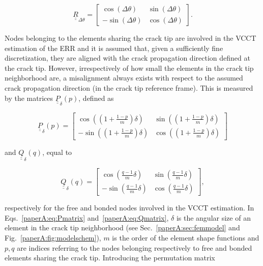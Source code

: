 \begin{equation}\label{paperA:eq:Rmatrix}
\underline{\underline{R}}_{\Delta\theta}=\begin{bmatrix}
\cos\left(\Delta\theta\right) & \sin\left(\Delta\theta\right) \\
-\sin\left(\Delta\theta\right) & \cos\left(\Delta\theta\right)
\end{bmatrix}.
\end{equation}

Nodes belonging to the elements sharing the crack tip are involved in the VCCT estimation of the ERR and it is assumed that, given a sufficiently fine discretization, they are aligned with the crack propagation direction defined at the crack tip. However, irrespectively of how small the elements in the crack tip neighborhood are, a misalignment always exists with respect to the assumed crack propagation direction (in the crack tip reference frame). This is measured by the matrices $\underline{\underline{P}}_{\delta}\left(p\right)$, defined as

\begin{equation}\label{paperA:eq:Pmatrix}
\underline{\underline{P}}_{\delta}\left(p\right)=\begin{bmatrix}
\cos\left(\left(1+\frac{1-p}{m}\right)\delta\right) & \sin\left(\left(1+\frac{1-p}{m}\right)\delta\right) \\
-\sin\left(\left(1+\frac{1-p}{m}\right)\delta\right) & \cos\left(\left(1+\frac{1-p}{m}\right)\delta\right)
\end{bmatrix}
\end{equation}

 and $\underline{\underline{Q}}_{\delta}\left(q\right)$, equal to

\begin{equation}\label{paperA:eq:Qmatrix}
\underline{\underline{Q}}_{\delta}\left(q\right)=\begin{bmatrix}
\cos\left(\frac{q-1}{m}\delta\right) & \sin\left(\frac{q-1}{m}\delta\right) \\
-\sin\left(\frac{q-1}{m}\delta\right) & \cos\left(\frac{q-1}{m}\delta\right)
\end{bmatrix},
\end{equation}

respectively for the free and bonded nodes involved in the VCCT estimation. In Eqs.~\ref{paperA:eq:Pmatrix} and~\ref{paperA:eq:Qmatrix}, $\delta$ is the angular size of an element in the crack tip neighborhood (see Sec.~\ref{paperA:sec:femmodel} and Fig.~\ref{paperA:fig:modelschem}), $m$ is the order of the element shape functions and $p,q$ are indices referring to the nodes belonging respectively to free and bonded elements sharing the crack tip. Introducing the permutation matrix


